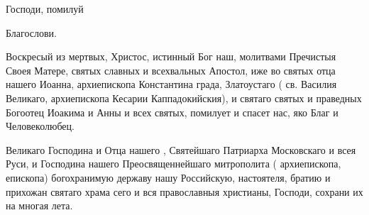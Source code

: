 \begin{mymulticols}
 Господи, помилуй 

 Благослови. 


 Воскресый из мертвых, Христос, истинный Бог наш, молитвами Пречистыя Своея Матере, святых славных и всехвальных Апостол, иже во святых отца нашего Иоанна, архиепископа Константина града, Златоустаго (  св. Василия Великаго, архиепископа Кесарии Каппадокийския), и святаго  святых и праведных Богоотец Иоакима и Анны и всех святых, помилует и спасет нас, яко Благ и Человеколюбец.


 Великаго Господина и Отца нашего , Святейшаго Патриарха Московскаго и всея Руси, и Господина нашего Преосвященнейшаго  митрополита (  архиепископа,  епископа)  богохранимую державу нашу Российскую, настоятеля, братию и прихожан святаго храма сего и вся православныя христианы, Господи, сохрани их на многая лета.



\end{mymulticols}

\mychapterending

